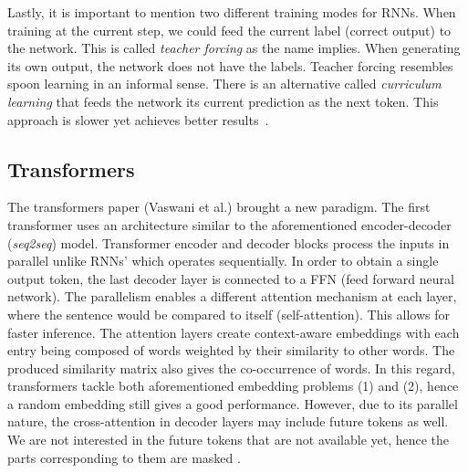 \documentclass{book}
\numberwithin{equation}{subsection}
\begin{document}
Lastly, it is important to mention two different training modes for RNNs. When training at the current step, we could feed the current label (correct output) to the network. This is called \textit{teacher forcing} as the name implies. When generating its own output, the network does not have the labels. Teacher forcing resembles spoon learning in an informal sense. There is an alternative called \textit{curriculum learning} that feeds the network its current prediction as the next token. This approach is slower yet achieves better results~\cite{lapan_deep_2020}.
\subsection{Transformers}
The transformers paper (Vaswani et al.) brought a new paradigm. The first transformer uses an architecture similar to the aforementioned encoder-decoder (\textit{seq2seq}) model. Transformer encoder and decoder blocks process the inputs in parallel unlike RNNs' which operates sequentially. In order to obtain a single output token, the last decoder layer is connected to a FFN (feed forward neural network). The parallelism enables a different attention mechanism at each layer, where the sentence would be compared to itself (self-attention). This allows for faster inference. The attention layers create context-aware embeddings with each entry being composed of words weighted by their similarity to other words. The produced similarity matrix also gives the co-occurrence of words. In this regard, transformers tackle both aforementioned embedding problems (1) and (2), hence a random embedding still gives a good performance. However, due to its parallel nature, the cross-attention in decoder layers may include future tokens as well. We are not interested in the future tokens that are not available yet, hence the parts corresponding to them are masked \cite{vaswani_attention_2023}.
\end{document}
